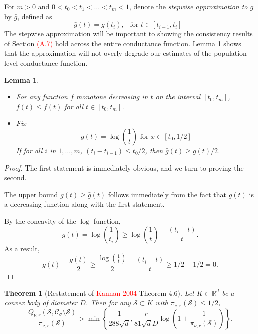\documentclass{article}
\newcommand{\Reals}{\mathbb{R}}
\newcommand{\Rd}{\Reals^d}
\newcommand{\1}{\mathbf{1}}
\newcommand{\Sset}{\mathcal{S}}
\newcommand{\Cset}{\mathcal{C}}
\newcommand{\Csig}{\Cset_{\sigma}}
\theoremstyle{aldenthm}
\newtheorem{lemma}{Lemma}
\newtheorem{theorem}{Theorem}
\begin{document}
For $m > 0$ and $0 < t_0 < t_1 < \ldots < t_m < 1$, denote the \emph{stepwise approximation to $g$} by $\bar{g}$, defined as
\begin{equation}
\label{eqn: stepwise_approximation}
\bar{g}(t) = g(t_i), ~~ \text{ for $t \in [t_{i-1}, t_i]$ }
\end{equation}
The stepwise approximation will be important to showing the consistency results of Section \textcolor{red}{(A.7)} hold across the entire conductance function. Lemma \ref{lem: stepwise_approximation} shows that the approximation will not overly degrade our estimates of the population-level conductance function.
\begin{lemma}
	\label{lem: stepwise_approximation}
	\begin{itemize}
		\item For any function $f$ monotone decreasing in $t$ on the interval $[t_0,t_m]$, $\bar{f}(t) \leq f(t)$ for all $t \in [t_0,t_m]$.
		\item Fix
		\begin{equation*}
		g(t) = \log\left(\frac{1}{t}\right) \text{ for $x \in [t_0, 1/2]$}
		\end{equation*}
		If for all $i$ in $1,\ldots,m$, $(t_i - t_{i - 1}) \leq t_0/2$, then $\bar{g}(t)\geq g(t) / 2$.
	\end{itemize}
\end{lemma}

\begin{proof}
	The first statement is immediately obvious, and we turn to proving the second. 
	
	The upper bound $g(t) \geq \bar{g}(t)$ follows immediately from the fact that $g(t)$ is a decreasing function along with the first statement.
	
	By the concavity of the $\log$ function, 
	\begin{equation*}
	\bar{g}(t) = \log\left(\frac{1}{t_i}\right) \geq \log\left(\frac{1}{t}\right) - \frac{(t_i - t)}{t}.
	\end{equation*}
	As a result,
	\begin{equation*}
	\bar{g}(t) - \frac{g(t)}{2} \geq \frac{\log\left(\frac{1}{t}\right)}{2} - \frac{(t_i - t)}{t} \geq 1/2 - 1/2 = 0.
	\end{equation*}
\end{proof}


\begin{theorem}[Restatement of \textcolor{red}{Kannan 2004} Theorem 4.6]
	\label{thm: kannan}
	Let $K \subset \Rd$ be a convex body of diameter $D$. Then for any $\Sset \subset K$ with $\pi_{\nu,r}(\Sset) \leq 1/2$,
	\begin{equation}
	\label{eqn: kannan}
	\frac{Q_{\nu,r}(\Sset, \Csig \setminus \Sset)}{\pi_{\nu,r}(\Sset)} > \min\left\{\frac{1}{288\sqrt{d}},\frac{r}{81 \sqrt{d}D}\log\left(1 + \frac{1}{\pi_{\nu,r}(\Sset)}\right)\right\}.
	\end{equation}
\end{theorem}
\end{document}
